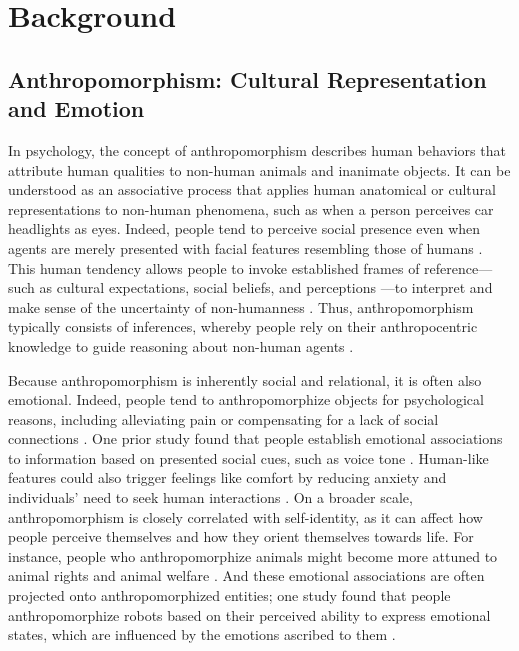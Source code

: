 \section{Background}

\subsection{Anthropomorphism: Cultural Representation and Emotion}

In psychology, the concept of anthropomorphism describes human behaviors that attribute human qualities to non-human animals and inanimate objects. It can be understood as an associative process that applies human anatomical or cultural representations to non-human phenomena, such as when a person perceives car headlights as eyes. Indeed, people tend to perceive social presence even when agents are merely presented with facial features resembling those of humans \citep{kontogiorgos2019effects}. This human tendency allows people to invoke established frames of reference---such as cultural expectations, social beliefs, and perceptions \citep{puzakova2013humanizing}---to interpret and make sense of the uncertainty of non-humanness \citep{boyer1996makes}. Thus, anthropomorphism typically consists of inferences, whereby people rely on their anthropocentric knowledge to guide reasoning about non-human agents \citep{epley2007seeing}.

Because anthropomorphism is inherently social and relational, it is often also emotional. Indeed, people tend to anthropomorphize objects for psychological reasons, including alleviating pain or compensating for a lack of social connections \citep{epley2007seeing}. One prior study found that people establish emotional associations to information based on presented social cues, such as voice tone \citep{pickett2004getting}. Human-like features could also trigger feelings like comfort by reducing anxiety and individuals' need to seek human interactions \citep{wan2021anthropomorphism}. On a broader scale, anthropomorphism is closely correlated with self-identity, as it can affect how people perceive themselves and how they orient themselves towards life. For instance, people who anthropomorphize animals might become more attuned to animal rights and animal welfare  \citep{wan2021anthropomorphism}. And these emotional associations are often projected onto anthropomorphized entities; one study found that people anthropomorphize robots based on their perceived ability to express emotional states, which are influenced by the emotions ascribed to them \citep{eyssel2010anthropomorphic}.


